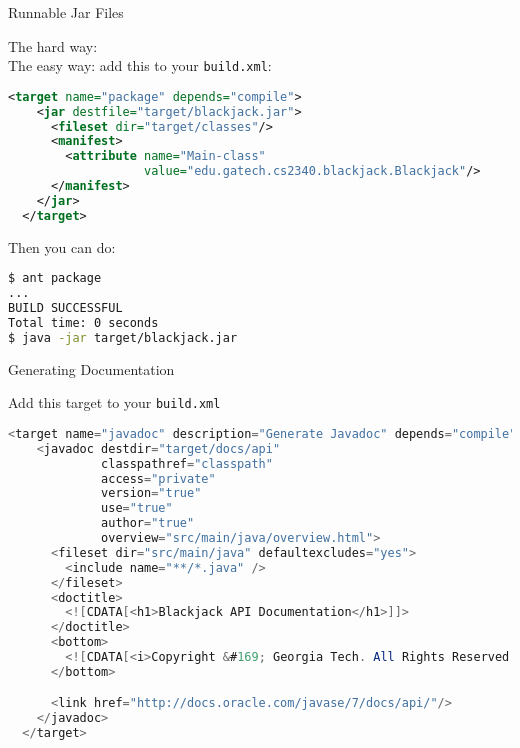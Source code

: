 \documentclass{beamer}
\begin{document}
\begin{frame}[fragile]{Runnable Jar Files}


The hard way: \\
\vspace{.1in}
The easy way: add this to your {\tt build.xml}:
\begin{lstlisting}[language=xml]
  <target name="package" depends="compile">
    <jar destfile="target/blackjack.jar">
      <fileset dir="target/classes"/>
      <manifest>
        <attribute name="Main-class"
                   value="edu.gatech.cs2340.blackjack.Blackjack"/>
      </manifest>
    </jar>
  </target>
\end{lstlisting}

Then you can do:

\begin{lstlisting}[language=bash]
$ ant package
...
BUILD SUCCESSFUL
Total time: 0 seconds
$ java -jar target/blackjack.jar
\end{lstlisting}



\end{frame}


\begin{frame}[fragile]{Generating Documentation}

Add this target to your {\tt build.xml}
\begin{lstlisting}[language=Java]
<target name="javadoc" description="Generate Javadoc" depends="compile">
    <javadoc destdir="target/docs/api"
             classpathref="classpath"
             access="private"
             version="true"
             use="true"
             author="true"
             overview="src/main/java/overview.html">
      <fileset dir="src/main/java" defaultexcludes="yes">
        <include name="**/*.java" />
      </fileset>
      <doctitle>
        <![CDATA[<h1>Blackjack API Documentation</h1>]]>
      </doctitle>
      <bottom>
        <![CDATA[<i>Copyright &#169; Georgia Tech. All Rights Reserved.</i>]]>
      </bottom>

      <link href="http://docs.oracle.com/javase/7/docs/api/"/>
    </javadoc>
  </target>
\end{lstlisting}



\end{frame}







\end{document}
